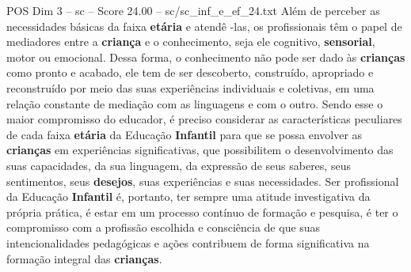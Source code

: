 \begin{textsample}{POS Dim 3 – sc – Score 24.00 – sc/sc\_inf\_e\_ef\_24.txt}
Além de perceber as necessidades básicas da faixa \textbf{etária} e atendê -las, os profissionais têm o papel de mediadores entre a \textbf{criança} e o conhecimento, seja ele cognitivo, \textbf{sensorial}, motor ou emocional.
Dessa forma, o conhecimento não pode ser dado às \textbf{crianças} como pronto e acabado, ele tem de ser descoberto, construído, apropriado e reconstruído por meio das suas experiências individuais e coletivas, em uma relação constante de mediação com as linguagens e com o outro.
Sendo esse o maior compromisso do educador, é preciso considerar as características peculiares de cada faixa \textbf{etária} da Educação \textbf{Infantil} para que se possa envolver as \textbf{crianças} em experiências significativas, que possibilitem o desenvolvimento das suas capacidades, da sua linguagem, da expressão de seus saberes, seus sentimentos, seus \textbf{desejos}, suas experiências e suas necessidades.
Ser profissional da Educação \textbf{Infantil} é, portanto, ter sempre uma atitude investigativa da própria prática, é estar em um processo contínuo de formação e pesquisa, é ter o compromisso com a profissão escolhida e consciência de que suas intencionalidades pedagógicas e ações contribuem de forma significativa na formação integral das \textbf{crianças}.

\end{textsample}
